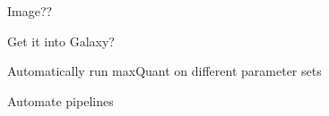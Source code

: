 Image??

Get it into Galaxy?

Automatically run maxQuant on different parameter sets

Automate pipelines

\vspace{13.5cm}
